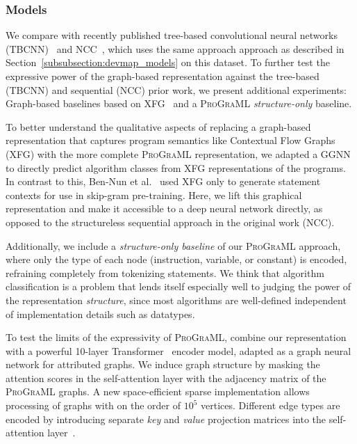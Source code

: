 \subsubsection{Models}

We compare with recently published tree-based convolutional neural
networks (TBCNN)~\cite{Mou2016} and NCC~\cite{Ben-nun2018}, which uses
the same approach approach as described in
Section~\ref{subsubsection:devmap_models} on this dataset. To further
test the expressive power of the graph-based representation against
the tree-based (TBCNN) and sequential (NCC) prior work, we present
additional experiments: Graph-based baselines based on
XFG~\cite{Ben-nun2018} and a \textsc{ProGraML} \emph{structure-only}
baseline.

To better understand the qualitative aspects of replacing a
graph-based representation that captures program semantics like
Contextual Flow Graphs~\cite{Ben-nun2018} (XFG) with the more complete
\textsc{ProGraML} representation, we adapted a GGNN~\cite{Li2015a} to
directly predict algorithm classes from XFG representations of the
programs. In contrast to this, Ben-Nun et al.~\cite{Ben-nun2018} used
XFG only to generate statement contexts for use in skip-gram
pre-training. Here, we lift this graphical representation and make it
accessible to a deep neural network directly, as opposed to the
structureless sequential approach in the original work (NCC).

Additionally, we include a \emph{structure-only baseline} of our
\textsc{ProGraML} approach, where only the type of each node
(instruction, variable, or constant) is encoded, refraining completely
from tokenizing statements. We think that algorithm classification is
a problem that lends itself especially well to judging the power of
the representation \emph{structure}, since most algorithms are
well-defined independent of implementation details such as datatypes.

To test the limits of the expressivity of \textsc{ProGraML}, combine
our representation with a powerful 10-layer
Transformer~\cite{Vaswani2017} encoder model, adapted as a graph
neural network for attributed graphs. We induce graph structure by
masking the attention scores in the self-attention layer with the
adjacency matrix of the \textsc{ProGraML} graphs. A new
space-efficient sparse implementation allows processing of graphs with
on the order of $10^5$ vertices. Different edge types are encoded by
introducing separate \emph{key} and \emph{value} projection matrices
into the self-attention layer~\cite{Vaswani2017,Fisches2020}.


